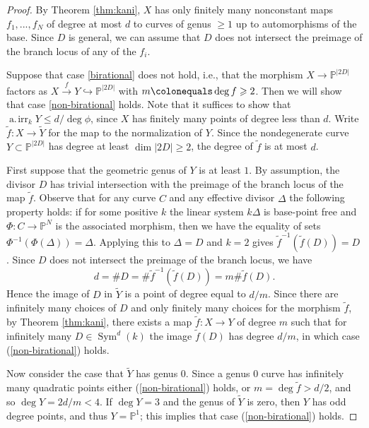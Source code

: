 \documentclass[11pt]{amsart}
\newcommand{\PP}{\mathbb{P}}
\DeclareMathOperator{\Sym}{Sym}
\newcommand{\airr}{\operatorname{a.\!irr}}
\theoremstyle{definition}
\theoremstyle{remark}
\begin{document}
\begin{proof}    
By Theorem \ref{thm:kani}, $X$ has only finitely many nonconstant maps $f_1, ... , f_N$ of degree at most \(d\) to curves of genus $\geqslant 1$ up to automorphisms of the base. Since $D$ is general, we can assume that $D$ does not intersect the preimage of the branch locus of any of the $f_i$. 

Suppose that case \eqref{birational} does not hold, i.e., that the morphism $X \to \PP^{|2D|}$ factors as $X \xrightarrow{f} Y \hookrightarrow \PP^{|2D|}$ with $m\colonequals \deg f \geqslant 2$. Then we will show that case \eqref{non-birational} holds.  Note that it suffices to show that \(\airr_kY \leqslant d/\deg \phi\), since \(X\) has finitely many points of degree less than \(d\). Write $\widetilde{f}: X \to \widetilde{Y}$ for the map to the normalization of \(Y\).  Since the nondegenerate curve $Y \subset \PP^{|2D|}$ has degree at least $\dim |2D|\geqslant 2$, the degree of $\widetilde{f}$ is at most $d$. 

First suppose that the geometric genus of $Y$ is at least $1$. By assumption, the divisor $D$ has trivial intersection with the preimage of the branch locus of the map \(\widetilde{f}\). Observe that for any curve $C$ and any effective divisor $\Delta$ the following property holds: if for some positive $k$ the linear system $k\Delta$ is base-point free and $\Phi: C \to \PP^N$ is the associated morphism, then we have the equality of sets $\Phi^{-1}(\Phi (\Delta)) = \Delta$. Applying this to $\Delta=D$ and $k=2$ gives $\widetilde{f}^{-1}\left(\widetilde{f}(D)\right)=D$. Since $D$ does not intersect the preimage of the branch locus, we have
\[d = \#D = \#\widetilde{f}^{-1}\left(\widetilde{f}(D)\right)=m\# \widetilde{f}(D).\] 
Hence the image of $D$ in $\widetilde{Y}$ is a point of degree equal to $d/m$.  Since there are infinitely many choices of $D$ and only finitely many choices for the morphism $\widetilde{f}$, by Theorem \ref{thm:kani}, there exists a map $\widetilde{f}:X \to Y$ of degree $m$  such that for infinitely many $D \in \Sym^d(k)$ the image $\widetilde{f}(D)$ has degree $d/m$, in which case (\ref{non-birational}) holds. 

Now consider the case that $\widetilde{Y}$ has genus $0$.  Since a genus $0$ curve has infinitely many quadratic points either (\ref{non-birational}) holds, or $m = \deg \widetilde{f} > d/2$, and so $\deg Y=2d/m < 4$. If $\deg Y=3$ and the genus of $\widetilde{Y}$ is zero, then \(Y\) has odd degree points, and thus $Y=\PP^1$; this implies that case (\ref{non-birational}) holds. 
    

\end{proof}
\end{document}
